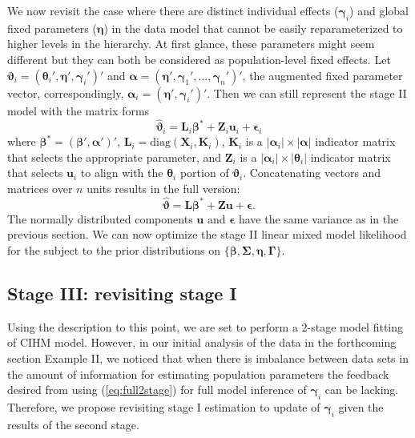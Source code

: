 \documentclass[12pt]{article}
\newcommand{\bt}{\boldsymbol{\theta}}
\newcommand{\bvt}{\boldsymbol{\vartheta}}
\newcommand{\bb}{\boldsymbol{\beta}}
\newcommand{\bn}{\boldsymbol{\eta}}
\newcommand{\bg}{\boldsymbol{\gamma}}
\newcommand{\bG}{\boldsymbol{\Gamma}}
\newcommand{\bSig}{\boldsymbol{\Sigma}}
\newcommand{\ba}{\boldsymbol{\alpha}}
\newcommand{\bL}{\mathbf{L}}
\newcommand{\bK}{\mathbf{K}}
\newcommand{\bX}{\mathbf{X}}
\newcommand{\bZ}{\mathbf{Z}}
\newcommand{\bu}{\mathbf{u}}
\begin{document}
We now revisit the case where there are distinct individual effects ($\bg_i$) and global fixed parameters ($\bn$) in the data model that cannot be easily reparameterized to higher levels in the hierarchy. At first glance, these parameters might seem different but they can both be considered as population-level fixed effects. Let $\bvt_i = (\bt_i', \bn', \bg_i')'$ and $\ba = (\bn', \bg_1',\dots,\bg_n')'$, the augmented fixed parameter vector, correspondingly, $\ba_i = (\bn', \bg_i')'$. Then we can still represent the stage II model with the matrix forms
\[
\hat{\bvt}_i = \bL_i\bb^* + \bZ_i\bu_i + \boldsymbol{\epsilon}_i
\]
where $\bb^* = (\bb', \ba')'$, $\bL_i = \text{diag}(\bX_i, \bK_i)$, $\bK_i$ is a $|\ba_i|\times |\ba|$ indicator matrix that selects the appropriate parameter, and $\bZ_i$ is a $|\ba_i|\times |\bt_i|$ indicator matrix that selects $\bu_i$ to align with the $\bt_i$ portion of $\bvt_i$. Concatenating vectors and matrices over $n$ units results in  the full version:
\begin{equation}\label{eq:full2stage}
\hat{\bvt} = \bL\bb^* + \bZ\bu + \boldsymbol{\epsilon}.
\end{equation}
The normally distributed components $\bu$ and $\boldsymbol{\epsilon}$ have the same variance as in the previous section. We can now optimize the stage II linear mixed model likelihood for the subject to the prior distributions on $\{\bb, \bSig, \bn, \bG\}$.   


\subsection{Stage III: revisiting stage I}  

Using the description to this point, we are set to perform a 2-stage model fitting of CIHM model. However, in our initial analysis of the data in the forthcoming section Example II, we noticed that when there is imbalance between data sets in the amount of information for estimating population parameters the feedback desired from using (\ref{eq:full2stage}) for full model inference of $\bg_i$ can be lacking. Therefore, we propose revisiting stage I estimation to update of $\bg_i$ given the results of the second stage. 
\end{document}
